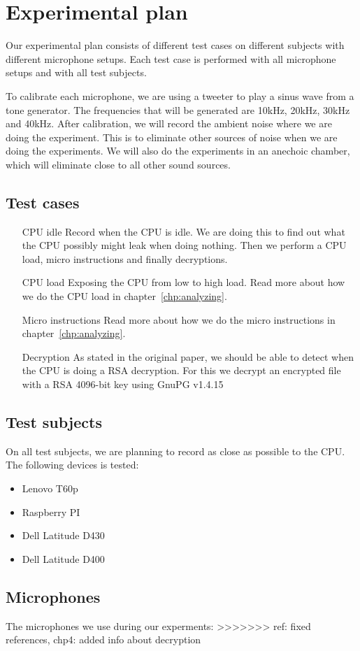 \section{Experimental plan}\label{sec:ch3_experimental_plan}

Our experimental plan consists of different test cases on different subjects with different microphone setups. 
Each test case is performed with all microphone setups and with all test subjects. 

To calibrate each microphone, we are using a tweeter to play a sinus wave from a tone generator. 
The frequencies that will be generated are 10kHz, 20kHz, 30kHz and 40kHz.
After calibration, we will record the ambient noise where we are doing the experiment.
This is to eliminate other sources of noise when we are doing the experiments.
We will also do the experiments in an anechoic chamber, which will eliminate close to all other sound sources.

\subsection{Test cases}


\begin{enumerate}
  \item[CPU idle] Record when the CPU is idle. 
  We are doing this to find out what the CPU possibly might leak when doing nothing. 
  Then we perform a CPU load, micro instructions and finally decryptions.
  \item[CPU load] Exposing the CPU from low to high load.
  Read more about how we do the CPU load in chapter~\ref{chp:analyzing}.
  \item[Micro instructions] Read more about how we do the micro instructions in chapter~\ref{chp:analyzing}.
  \item[Decryption] As stated in the original paper, we should be able to detect when the CPU is doing a RSA decryption. 
  For this we decrypt an encrypted file with a RSA 4096-bit key using GnuPG v1.4.15~\cite{url:GnuPG_1.4.15}
\end{enumerate}

\subsection{Test subjects}
On all test subjects, we are planning to record as close as possible to the CPU. 
The following devices is tested:

\begin{itemize}[topsep=-1em,parsep=0em,itemsep=0em]
 \item Lenovo T60p
 \item Raspberry PI
 \item Dell Latitude D430
 \item Dell Latitude D400
\end{itemize}

\subsection{Microphones}
The microphones we use during our experments:
>>>>>>> ref: fixed references, chp4: added info about decryption

